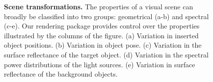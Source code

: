 \documentclass{jov}
\begin{document}
\begin{figure}
    \caption{{\bf Scene transformations.} The properties of a visual scene can broadly be classified into two groups: geometrical (a-b) and spectral (c-e). Our rendering package provides control over the properties illustrated by the columns of the figure. (a) Variation in inserted object positions. (b) Variation in object pose. (c) Variation in the surface reflectance of the target object. (d) Variation in the spectral power distributions of the light sources. (e) Variation in surface reflectance of the background objects.
\label{fig:VWCCTransformations}}
\end{figure}
\end{document}
